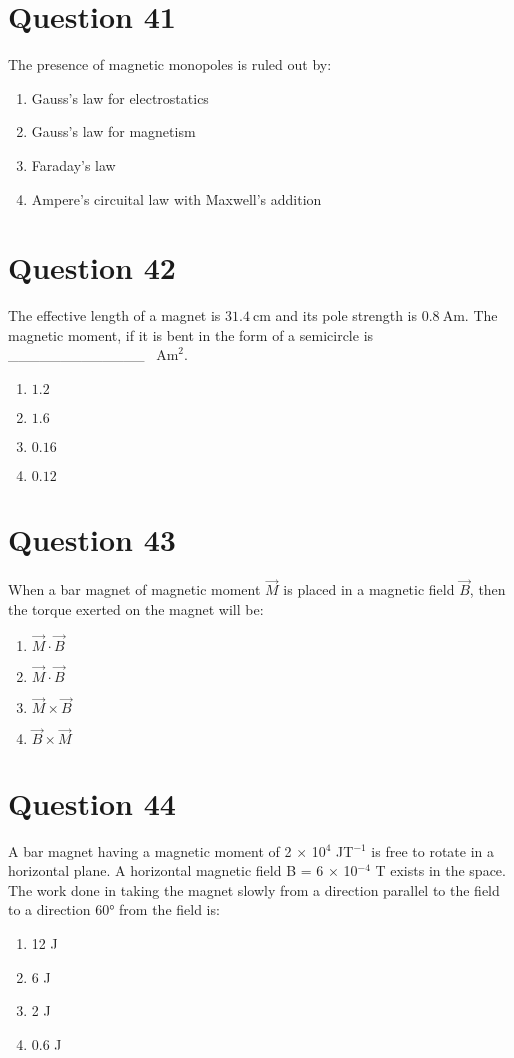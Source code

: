 \documentclass{article}
\begin{document}
\section*{Question 41}
The presence of magnetic monopoles is ruled out by:
\begin{enumerate}[label=(\alph*)]
\item Gauss's law for electrostatics
\item Gauss's law for magnetism
\item Faraday's law
\item Ampere's circuital law with Maxwell's addition
\end{enumerate}
\newpage
\section*{Question 42}
The effective length of a magnet is \(31.4 \mathrm{~cm}\) and its pole strength is \(0.8 \mathrm{~Am}\). The magnetic moment, if it is bent in the form of a semicircle is _____________  \(\mathrm{Am}^2\).
\begin{enumerate}[label=(\alph*)]
\item \(1.2\)
\item \(1.6\)
\item \(0.16\)
\item \(0.12\)
\end{enumerate}
\newpage
\section*{Question 43}
When a bar magnet of magnetic moment \(\vec{M}\) is placed in a magnetic field \(\vec{B}\), then the torque exerted on the magnet will be:
\begin{enumerate}[label=(\alph*)]
\item \(\vec{M} \cdot \vec{B}\)
\item \(\vec{M} \cdot \vec{B}\)
\item \(\vec{M} \times \vec{B}\)
\item \(\vec{B} \times \vec{M}\)
\end{enumerate}
\newpage
\section*{Question 44}
A bar magnet having a magnetic moment of 2 × 10$^{4}$ JT$^{-1}$ is free to rotate in a horizontal plane. A horizontal magnetic field B = 6 × 10$^{-4}$ T exists in the space. The work done in taking the magnet slowly from a direction parallel to the field to a direction 60° from the field is:
\begin{enumerate}[label=(\alph*)]
\item 12 J
\item 6 J
\item 2 J
\item 0.6 J
\end{enumerate}
\newpage
\end{document}
